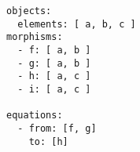 \par\begin{minipage}{60ex}
\begin{verbatim}
objects:
  elements: [ a, b, c ]
morphisms:
  - f: [ a, b ]
  - g: [ a, b ]
  - h: [ a, c ]
  - i: [ a, c ]

equations:
  - from: [f, g]
    to: [h]



\end{verbatim}
\end{minipage}\par